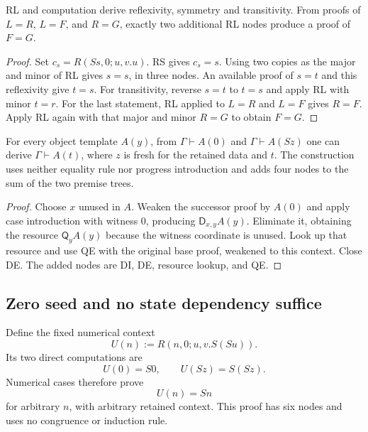 \begin{lemma}\label{zcc:algebra}
RL and computation derive reflexivity, symmetry and transitivity.
From proofs of $L=R$, $L=F$, and $R=G$, exactly two additional RL nodes
produce a proof of $F=G$.
\end{lemma}
\begin{proof}
Set $c_s=R(Ss,0;u,v.u)$. RS gives $c_s=s$. Using two copies as the
major and minor of RL gives $s=s$, in three nodes. An available proof
of $s=t$ and this reflexivity give $t=s$. For transitivity, reverse
$s=t$ to $t=s$ and apply RL with minor $t=r$.
For the last statement, RL applied to $L=R$ and $L=F$ gives $R=F$.
Apply RL again with that major and minor $R=G$ to obtain $F=G$.
\end{proof}

\begin{lemma}\label{zcc:cases}
For every object template $A(y)$, from $\Gamma\vdash A(0)$ and
$\Gamma\vdash A(Sz)$ one can derive $\Gamma\vdash A(t)$, where $z$
is fresh for the retained data and $t$. The construction uses neither
equality rule nor progress introduction and adds four nodes to the
sum of the two premise trees.
\end{lemma}
\begin{proof}
Choose $x$ unused in $A$. Weaken the successor proof by $A(0)$ and apply
case introduction with witness $0$, producing $\mathsf D_{x,y}A(y)$.
Eliminate it, obtaining the resource $\mathsf Q_yA(y)$ because the
witness coordinate is unused. Look up that resource and use QE with
the original base proof, weakened to this context. Close DE. The added
nodes are DI, DE, resource lookup, and QE.
\end{proof}

\subsection{Zero seed and no state dependency suffice}

Define the fixed numerical context
\[
 U(n):=R(n,0;u,v.S(Su)).
 \label{zcc:U}
\]
Its two direct computations are
\[
 U(0)=S0,\qquad U(Sz)=S(Sz).
\]
Numerical cases therefore prove
\[
                         U(n)=Sn
 \tag{U}\label{zcc:Urep}
\]
for arbitrary $n$, with arbitrary retained context. This proof has six
nodes and uses no congruence or induction rule.

